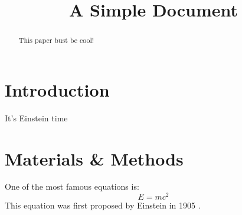 \documentclass[12pt]{article}
\title{A Simple Document}
\date{}
\begin{document}
  \maketitle

  \begin{abstract}
    This paper bust be cool!
  \end{abstract}

  \section{Introduction}
    It's Einstein time

  \section{Materials \& Methods}
  One of the most famous equations is:
  \begin{equation}
  E = mc^2
  \end{equation}
  This equation was first proposed by Einstein in 1905
  \cite{einstein1905does}.

  
  
\end{document}
